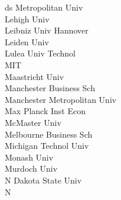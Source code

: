 \documentclass[a4paper]{article}
\begin{document}
\begin{multicols*}{2}
\begin{footnotesize}
ds Metropolitan Univ \\ Lehigh Univ \\ Leibniz Univ Hannover \\ Leiden Univ \\ Lulea Univ Technol \\ MIT \\ Maastricht Univ \\ Manchester Business Sch \\ Manchester Metropolitan Univ \\ Max Planck Inst Econ \\ McMaster Univ \\ Melbourne Business Sch \\ Michigan Technol Univ \\ Monash Univ \\ Murdoch Univ \\ N Dakota State Univ \\ N
\end{footnotesize}
\end{multicols*}
\end{document}

